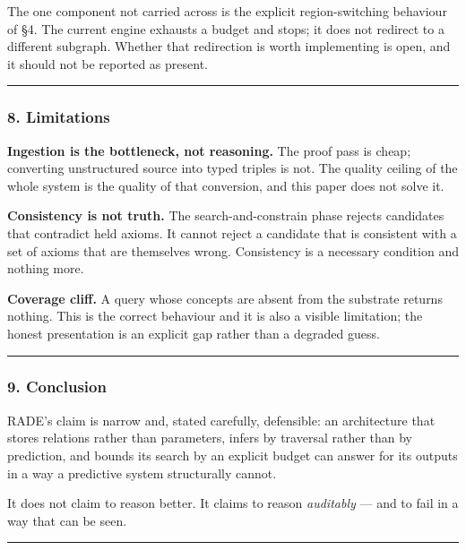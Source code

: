 \documentclass[
  11pt,
  a4paper,
]{article}
\begin{document}
The one component not carried across is the explicit region-switching
behaviour of §4. The current engine exhausts a budget and stops; it does
not redirect to a different subgraph. Whether that redirection is worth
implementing is open, and it should not be reported as present.

\begin{center}\rule{0.5\linewidth}{0.5pt}\end{center}

\subsubsection{8. Limitations}\label{limitations}

\textbf{Ingestion is the bottleneck, not reasoning.} The proof pass is
cheap; converting unstructured source into typed triples is not. The
quality ceiling of the whole system is the quality of that conversion,
and this paper does not solve it.

\textbf{Consistency is not truth.} The search-and-constrain phase
rejects candidates that contradict held axioms. It cannot reject a
candidate that is consistent with a set of axioms that are themselves
wrong. Consistency is a necessary condition and nothing more.

\textbf{Coverage cliff.} A query whose concepts are absent from the
substrate returns nothing. This is the correct behaviour and it is also
a visible limitation; the honest presentation is an explicit gap rather
than a degraded guess.

\begin{center}\rule{0.5\linewidth}{0.5pt}\end{center}

\subsubsection{9. Conclusion}\label{conclusion}

RADE's claim is narrow and, stated carefully, defensible: an
architecture that stores relations rather than parameters, infers by
traversal rather than by prediction, and bounds its search by an
explicit budget can answer for its outputs in a way a predictive system
structurally cannot.

It does not claim to reason better. It claims to reason \emph{auditably}
--- and to fail in a way that can be seen.

\begin{center}\rule{0.5\linewidth}{0.5pt}\end{center}
\end{document}
